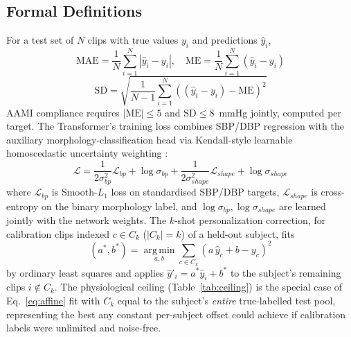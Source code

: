 \documentclass[journal]{IEEEtran}
\begin{document}
\subsection{Formal Definitions}
For a test set of $N$ clips with true values $y_i$ and predictions $\hat{y}_i$,
\begin{equation}
\mathrm{MAE} = \frac{1}{N}\sum_{i=1}^{N} \left| \hat{y}_i - y_i \right|, \quad
\mathrm{ME} = \frac{1}{N}\sum_{i=1}^{N} \left( \hat{y}_i - y_i \right)
\label{eq:mae}
\end{equation}
\begin{equation}
\mathrm{SD} = \sqrt{\frac{1}{N-1}\sum_{i=1}^{N} \left( (\hat{y}_i - y_i) - \mathrm{ME} \right)^2 }
\label{eq:sd}
\end{equation}
AAMI compliance requires $|\mathrm{ME}| \le 5$ and $\mathrm{SD} \le 8$~mmHg jointly, computed per target. The Transformer's training loss combines SBP/DBP regression with the auxiliary morphology-classification head via Kendall-style learnable homoscedastic uncertainty weighting \cite{shen2026}:
\begin{equation}
\mathcal{L} = \frac{1}{2\sigma_{bp}^2}\mathcal{L}_{bp} + \log\sigma_{bp} + \frac{1}{2\sigma_{shape}^2}\mathcal{L}_{shape} + \log\sigma_{shape}
\label{eq:kendall}
\end{equation}
where $\mathcal{L}_{bp}$ is Smooth-$L_1$ loss on standardised SBP/DBP targets, $\mathcal{L}_{shape}$ is cross-entropy on the binary morphology label, and $\log\sigma_{bp},\log\sigma_{shape}$ are learned jointly with the network weights. The $k$-shot personalization correction, for calibration clips indexed $c \in C_k$ ($|C_k|=k$) of a held-out subject, fits
\begin{equation}
(a^\ast, b^\ast) = \operatorname*{arg\,min}_{a,b} \sum_{c \in C_k} \left( a\,\hat{y}_c + b - y_c \right)^2
\label{eq:affine}
\end{equation}
by ordinary least squares and applies $\hat{y}'_i = a^\ast \hat{y}_i + b^\ast$ to the subject's remaining clips $i \notin C_k$. The physiological ceiling (Table~\ref{tab:ceiling}) is the special case of Eq.~\eqref{eq:affine} fit with $C_k$ equal to the subject's \emph{entire} true-labelled test pool, representing the best any constant per-subject offset could achieve if calibration labels were unlimited and noise-free.
\end{document}
